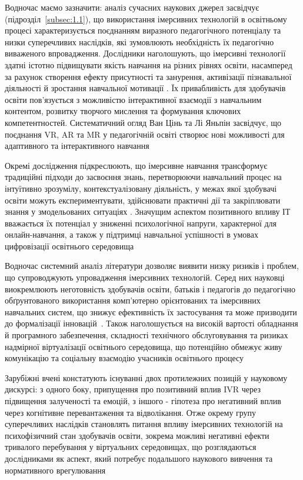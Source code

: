 Водночас маємо зазначити: аналіз сучасних наукових джерел засвідчує (підрозділ~\ref{subsec:1.1}), що використання імерсивних технологій в освітньому процесі характеризується поєднанням виразного педагогічного потенціалу та низки суперечливих наслідків, які зумовлюють необхідність їх педагогічно виваженого впровадження. Дослідники наголошують, що імерсивні технології здатні істотно підвищувати якість навчання на різних рівнях освіти, насамперед за рахунок створення ефекту присутності та занурення, активізації пізнавальної діяльності й зростання навчальної мотивації \cite{Radianti2020VR}. Їх привабливість для здобувачів освіти пов'язується з можливістю інтерактивної взаємодії з навчальним контентом, розвитку творчого мислення та формування ключових компетентностей. Систематичний огляд Ван Цінь та Лі Яньпін засвідчує, що поєднання VR, AR та MR у педагогічній освіті створює нові можливості для адаптивного та інтерактивного навчання~\cite{Angelov2025Synergy}

Окремі дослідження підкреслюють, що імерсивне навчання трансформує традиційні підходи до засвоєння знань, перетворюючи навчальний процес на інтуїтивно зрозумілу, контекстуалізовану діяльність, у межах якої здобувачі освіти можуть експериментувати, здійснювати практичні дії та закріплювати знання у змодельованих ситуаціях \cite[c.~55--56]{Lytvynova2023Health}. Значущим аспектом позитивного впливу ІТ вважається їх потенціал у зниженні психологічної напруги, характерної для онлайн-навчання, а також у підтримці навчальної успішності в умовах цифровізації освітнього середовища \cite[c.~56]{Lytvynova2023Health}

Водночас системний аналіз літератури дозволяє виявити низку ризиків і проблем, що супроводжують упровадження імерсивних технологій. Серед них науковці виокремлюють неготовність здобувачів освіти, батьків і педагогів до педагогічно обґрунтованого використання комп'ютерно орієнтованих та імерсивних навчальних систем, що знижує ефективність їх застосування та може призводити до формалізації інновацій~\cite{Radianti2020VR}. Також наголошується на високій вартості обладнання й програмного забезпечення, складності технічного обслуговування та ризиках надмірної віртуалізації освітнього середовища, що потенційно обмежує живу комунікацію та соціальну взаємодію учасників освітнього процесу~\cite{DiNatale2020Immersive}

Зарубіжні вчені констатують існуванні двох протилежних позицій у науковому дискурсі: з одного боку, припущення про позитивний вплив IVR через підвищення залученості та емоцій, з іншого - гіпотеза про негативний вплив через когнітивне перевантаження та відволікання\cite{Parong2021Cognitive}. Отже окрему групу суперечливих наслідків становлять питання впливу імерсивних технологій на психофізичний стан здобувачів освіти, зокрема можливі негативні ефекти тривалого перебування у віртуальних середовищах, що розглядаються дослідниками як аспект, який потребує подальшого наукового вивчення та нормативного врегулювання~\cite{Parong2021Cognitive}

